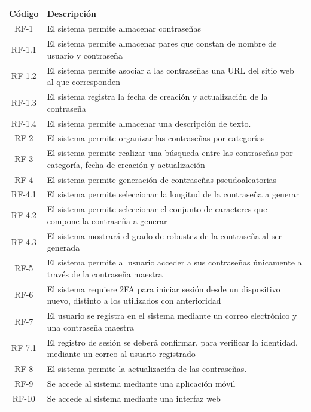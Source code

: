 \documentclass{article}
\begin{document}
\begin{table}[H]
    \centering
    \begin{tabular}{| c | p{30em} |}
    \hline
        Código &  Descripción  \\ \hline
        RF-1 & El sistema permite almacenar contraseñas \\ \hline
        RF-1.1 & El sistema permite almacenar pares que constan de nombre de usuario y contraseña  \\ \hline
        RF-1.2 & El sistema permite asociar a las contraseñas una URL del sitio web al que corresponden \\ \hline
        RF-1.3 & El sistema registra la fecha de creación y actualización de la contraseña \\ \hline
        RF-1.4 & El sistema permite almacenar una descripción de texto. \\ \hline
        RF-2 & El  sistema permite organizar las contraseñas por categorías \\ \hline
        RF-3 & El sistema permite realizar una búsqueda entre las contraseñas por categoría, fecha de creación y actualización  \\ \hline
        RF-4 & El sistema permite generación de contraseñas pseudoaleatorias \\ \hline
        RF-4.1 & El sistema permite seleccionar la longitud de la contraseña a generar\\ \hline
        RF-4.2 & El sistema permite seleccionar el conjunto de caracteres que compone la contraseña a generar\\ \hline
        RF-4.3 & El sistema mostrará el grado de robustez de la contraseña al ser generada \\ \hline
        RF-5 & El sistema permite al usuario acceder a sus contraseñas únicamente a través de la contraseña maestra \\ \hline
        RF-6 & El sistema requiere 2FA para iniciar sesión desde un dispositivo nuevo, distinto a los utilizados con anterioridad \\ \hline
        RF-7 & El usuario se registra en el sistema mediante un correo electrónico y una contraseña maestra\\ \hline
        RF-7.1 & El registro de sesión se deberá confirmar, para verificar la identidad, mediante un correo al usuario registrado \\ \hline
        RF-8 & El sistema permite la actualización de las contraseñas. \\ \hline
        RF-9 & Se accede al sistema mediante una aplicación móvil \\ \hline
        RF-10 & Se accede al sistema mediante una interfaz web \\ \hline
    \end{tabular}
\end{table}
\end{document}

